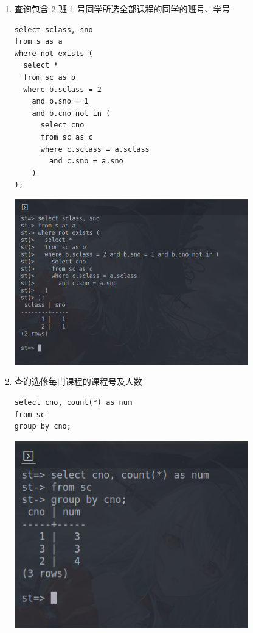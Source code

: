 \documentclass[hyperref,UTF8,12pt,a4paper]{ctexart}
\begin{document}
\begin{enumerate}
\item 查询包含 2 班 1 号同学所选全部课程的同学的班号、学号

\begin{verbatim}
select sclass, sno
from s as a
where not exists (
  select *
  from sc as b
  where b.sclass = 2
    and b.sno = 1
    and b.cno not in (
      select cno
      from sc as c
      where c.sclass = a.sclass
        and c.sno = a.sno
    )
);
\end{verbatim}

\begin{center}
\includegraphics[width=0.8\textwidth]{21.png}
\end{center}

\item 查询选修每门课程的课程号及人数

\begin{verbatim}
select cno, count(*) as num
from sc
group by cno;
\end{verbatim}

\begin{center}
\includegraphics[width=0.8\textwidth]{22.png}
\end{center}


\end{enumerate}
\end{document}
